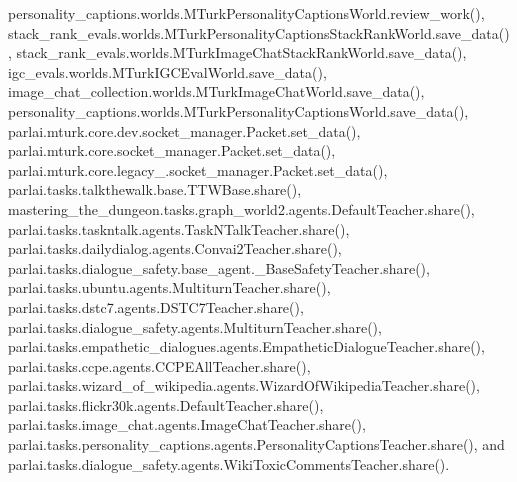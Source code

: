 personality\+\_\+captions.\+worlds.\+M\+Turk\+Personality\+Captions\+World.\+review\+\_\+work(), stack\+\_\+rank\+\_\+evals.\+worlds.\+M\+Turk\+Personality\+Captions\+Stack\+Rank\+World.\+save\+\_\+data(), stack\+\_\+rank\+\_\+evals.\+worlds.\+M\+Turk\+Image\+Chat\+Stack\+Rank\+World.\+save\+\_\+data(), igc\+\_\+evals.\+worlds.\+M\+Turk\+I\+G\+C\+Eval\+World.\+save\+\_\+data(), image\+\_\+chat\+\_\+collection.\+worlds.\+M\+Turk\+Image\+Chat\+World.\+save\+\_\+data(), personality\+\_\+captions.\+worlds.\+M\+Turk\+Personality\+Captions\+World.\+save\+\_\+data(), parlai.\+mturk.\+core.\+dev.\+socket\+\_\+manager.\+Packet.\+set\+\_\+data(), parlai.\+mturk.\+core.\+socket\+\_\+manager.\+Packet.\+set\+\_\+data(), parlai.\+mturk.\+core.\+legacy\+\_.\+socket\+\_\+manager.\+Packet.\+set\+\_\+data(), parlai.\+tasks.\+talkthewalk.\+base.\+T\+T\+W\+Base.\+share(), mastering\+\_\+the\+\_\+dungeon.\+tasks.\+graph\+\_\+world2.\+agents.\+Default\+Teacher.\+share(), parlai.\+tasks.\+taskntalk.\+agents.\+Task\+N\+Talk\+Teacher.\+share(), parlai.\+tasks.\+dailydialog.\+agents.\+Convai2\+Teacher.\+share(), parlai.\+tasks.\+dialogue\+\_\+safety.\+base\+\_\+agent.\+\_\+\+Base\+Safety\+Teacher.\+share(), parlai.\+tasks.\+ubuntu.\+agents.\+Multiturn\+Teacher.\+share(), parlai.\+tasks.\+dstc7.\+agents.\+D\+S\+T\+C7\+Teacher.\+share(), parlai.\+tasks.\+dialogue\+\_\+safety.\+agents.\+Multiturn\+Teacher.\+share(), parlai.\+tasks.\+empathetic\+\_\+dialogues.\+agents.\+Empathetic\+Dialogue\+Teacher.\+share(), parlai.\+tasks.\+ccpe.\+agents.\+C\+C\+P\+E\+All\+Teacher.\+share(), parlai.\+tasks.\+wizard\+\_\+of\+\_\+wikipedia.\+agents.\+Wizard\+Of\+Wikipedia\+Teacher.\+share(), parlai.\+tasks.\+flickr30k.\+agents.\+Default\+Teacher.\+share(), parlai.\+tasks.\+image\+\_\+chat.\+agents.\+Image\+Chat\+Teacher.\+share(), parlai.\+tasks.\+personality\+\_\+captions.\+agents.\+Personality\+Captions\+Teacher.\+share(), and parlai.\+tasks.\+dialogue\+\_\+safety.\+agents.\+Wiki\+Toxic\+Comments\+Teacher.\+share().

\mbox{\label{classparlai_1_1messenger_1_1tasks_1_1overworld__demo_1_1worlds_1_1MessengerChatOnboardWorld_a402b2140631c7d30767873c1125842b6}} 
